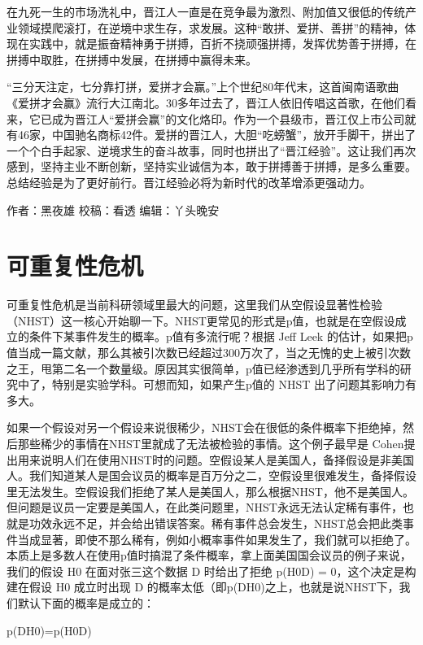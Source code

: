 \documentclass[
]{book}
\begin{document}
在九死一生的市场洗礼中，晋江人一直是在竞争最为激烈、附加值又很低的传统产业领域摸爬滚打，在逆境中求生存，求发展。这种``敢拼、爱拼、善拼''的精神，体现在实践中，就是振奋精神勇于拼搏，百折不挠顽强拼搏，发挥优势善于拼搏，在拼搏中取胜，在拼搏中发展，在拼搏中赢得未来。

``三分天注定，七分靠打拼，爱拼才会赢。''上个世纪80年代末，这首闽南语歌曲《爱拼才会赢》流行大江南北。30多年过去了，晋江人依旧传唱这首歌，在他们看来，它已成为晋江人``爱拼会赢''的文化烙印。作为一个县级市，晋江仅上市公司就有46家，中国驰名商标42件。爱拼的晋江人，大胆``吃螃蟹''，放开手脚干，拼出了一个个白手起家、逆境求生的奋斗故事，同时也拼出了``晋江经验''。这让我们再次感到，坚持主业不断创新，坚持实业诚信为本，敢于拼搏善于拼搏，是多么重要。总结经验是为了更好前行。晋江经验必将为新时代的改革增添更强动力。

作者：黑夜雄
校稿：看透
编辑：丫头晚安

\hypertarget{ux53efux91cdux590dux6027ux5371ux673a}{%
\section{可重复性危机}\label{ux53efux91cdux590dux6027ux5371ux673a}}

可重复性危机是当前科研领域里最大的问题，这里我们从空假设显著性检验（NHST）这一核心开始聊一下。NHST更常见的形式是p值，也就是在空假设成立的条件下某事件发生的概率。p值有多流行呢？根据 Jeff Leek 的估计，如果把p值当成一篇文献，那么其被引次数已经超过300万次了，当之无愧的史上被引次数之王，甩第二名一个数量级。原因其实很简单，p值已经渗透到几乎所有学科的研究中了，特别是实验学科。可想而知，如果产生p值的 NHST 出了问题其影响力有多大。

如果一个假设对另一个假设来说很稀少，NHST会在很低的条件概率下拒绝掉，然后那些稀少的事情在NHST里就成了无法被检验的事情。这个例子最早是 Cohen提出用来说明人们在使用NHST时的问题。空假设某人是美国人，备择假设是非美国人。我们知道某人是国会议员的概率是百万分之二，空假设里很难发生，备择假设里无法发生。空假设我们拒绝了某人是美国人，那么根据NHST，他不是美国人。但问题是议员一定要是美国人，在此类问题里，NHST永远无法认定稀有事件，也就是功效永远不足，并会给出错误答案。稀有事件总会发生，NHST总会把此类事件当成显著，即使不那么稀有，例如小概率事件如果发生了，我们就可以拒绝了。本质上是多数人在使用p值时搞混了条件概率，拿上面美国国会议员的例子来说，我们的假设 H0 在面对张三这个数据 D 时给出了拒绝 p(H0\textbar D) = 0，这个决定是构建在假设 H0 成立时出现 D 的概率太低（即p(D\textbar H0)之上，也就是说NHST下，我们默认下面的概率是成立的：

p(D\textbar H0)=p(H0\textbar D)
\end{document}
